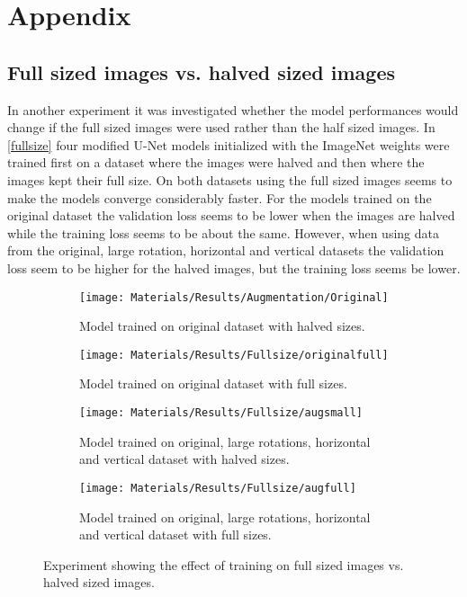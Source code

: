 \section{Appendix}
\subsection{Full sized images vs. halved sized images}
In another experiment it was investigated whether the model performances would change if the full sized images were used rather than the half sized images. In \autoref{fullsize} four modified U-Net models initialized with the ImageNet weights were trained first on a dataset where the images were halved and then where the images kept their full size. On both datasets using the full sized images seems to make the models converge considerably faster. For the models trained on the original dataset the validation loss seems to be lower when the images are halved while the training loss seems to be about the same. However, when using data from the original, large rotation, horizontal and vertical datasets the validation loss seem to be higher for the halved images, but the training loss seems be lower.
\begin{figure}[H]
	\centering
	\begin{subfigure}[b]{0.24\linewidth}
		\centering
		\texttt{[image: Materials/Results/Augmentation/Original]}
		\caption{Model trained on original dataset with halved sizes.\newline\newline}
	\end{subfigure}
	\hfill
	\begin{subfigure}[b]{0.24\linewidth}
		\centering
		\texttt{[image: Materials/Results/Fullsize/originalfull]}
		\caption{Model trained on original dataset with full sizes.\newline\newline}
	\end{subfigure}
	\hfill
	\begin{subfigure}[b]{0.24\linewidth}
		\centering
		\texttt{[image: Materials/Results/Fullsize/augsmall]}
		\caption{Model trained on original, large rotations, horizontal and vertical dataset with halved sizes.}
	\end{subfigure}
	\hfill
	\begin{subfigure}[b]{0.24\linewidth}
		\centering
		\texttt{[image: Materials/Results/Fullsize/augfull]}
		\caption{Model trained on original, large rotations, horizontal and vertical dataset with full sizes.}
	\end{subfigure}
	\caption{Experiment showing the effect of training on full sized images vs. halved sized images.}
	\label{fullsize}
\end{figure}

